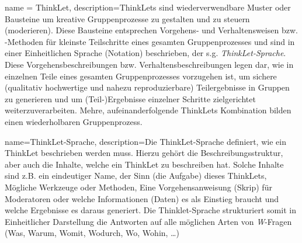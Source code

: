 {
        name = ThinkLet,
        description={ThinkLets sind wiederverwendbare Muster oder Bausteine um kreative Gruppenprozesse zu gestalten und zu steuern (moderieren). Diese Bausteine entsprechen Vorgehens- und Verhaltensweisen bzw. -Methoden für kleinste Teilschritte eines gesamten Gruppenprozesses und sind in einer Einheitlichen Sprache (Notation) beschrieben, der s.g. \textit{ \gls{ThinkLet-Sprache}}. Diese Vorgehensbeschreibungen bzw. Verhaltensbeschreibungen legen dar, wie in einzelnen Teile eines gesamten Gruppenprozesses vorzugehen ist, um sichere (qualitativ hochwertige und nahezu reproduzierbare) Teilergebnisse in Gruppen zu generieren und um (Teil-)Ergebnisse einzelner Schritte zielgerichtet weiterzuverarbeiten. Mehre, aufeinanderfolgende ThinkLets Kombination bilden einen wiederholbaren Gruppenprozess.
        }
}



{
        name=ThinkLet-Sprache, description={Die ThinkLet-Sprache definiert, wie
                ein \gls{ThinkLet}
        beschrieben werden muss. Hierzu gehört die Beschreibungsstruktur, aber
        auch die Inhalte, welche ein ThinkLet zu beschreiben hat. Solche Inhalte
        sind z.B. ein eindeutiger Name, der Sinn (die Aufgabe) dieses ThinkLets,
Mögliche Werkzeuge oder Methoden, Eine Vorgehensanweisung (Skrip) für
Moderatoren oder welche Informationen (Daten) es als Einstieg braucht und welche
Ergebnisse es daraus generiert. Die Thinklet-Sprache strukturiert somit in
Einheitlicher Darstellung die Antworten auf alle möglichen Arten von
\textit{W}-Fragen (Was, Warum, Womit, Wodurch, Wo, Wohin, \dots)}
}



%
%
%
%
%
%


%
%

